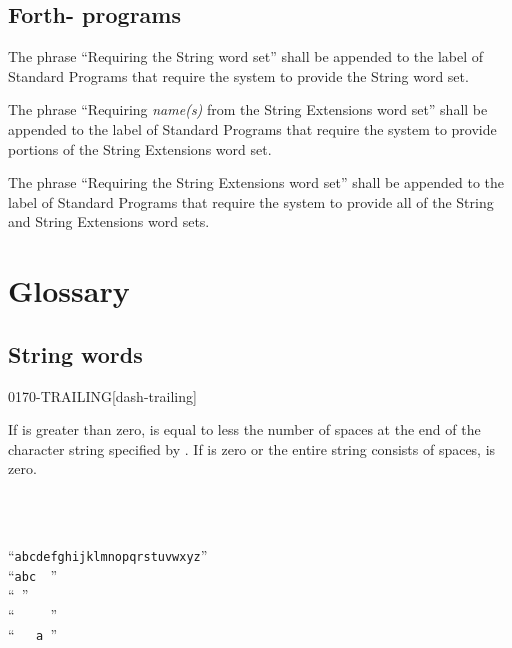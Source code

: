 \subsection{Forth-\snapshot{} programs} %

The phrase ``Requiring the String word set'' shall be appended to
the label of Standard Programs that require the system to provide
the String word set.

The phrase ``Requiring \emph{name(s)} from the String Extensions
word set'' shall be appended to the label of Standard Programs that
require the system to provide portions of the String Extensions
word set.

The phrase ``Requiring the String Extensions word set'' shall be
appended to the label of Standard Programs that require the system
to provide all of the String and String Extensions word sets.


\section{Glossary} %
\vspace{1ex}

\subsection{String words} %
\vspace{1ex}

\begin{worddef}{0170}{-TRAILING}[dash-trailing]
\item {}

	If  is greater than zero,  is equal to
	 less the number of spaces at the end of the
	character string specified by . If 
	is zero or the entire string consists of spaces,  is
	zero.

	\begin{testing} %
		 \\
		 \\

				\tab {} ``\texttt{abcdefghijklmnopqrstuvwxyz}'' \\
		 			\tab[2.5]  ``\texttt{abc~~}'' \\
							\tab[5.2]  ``\texttt{~}'' \\
			\tab[1]  ``\texttt{~~~~~}'' \\
						\tab[2.8]  ``\texttt{~~~a~}''
	\end{testing}
\end{worddef}


